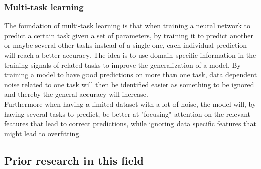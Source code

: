 \subsubsection{Multi-task learning}
The foundation of multi-task learning is that when training a neural network to predict a certain task given a set of parameters, by training it to predict another or maybe several other tasks instead of a single one, each individual prediction will reach a better accuracy. The idea is to use domain-specific information in the training signals of related tasks to improve the generalization of a model. By training a model to have good predictions on more than one task, data dependent noise related to one task will then be identified easier as something to be ignored and thereby the general accuracy will increase. \citep{ruder-2017}\\
Furthermore when having a limited dataset with a lot of noise, the model will, by having several tasks to predict, be better at "focusing" attention on the relevant features that lead to correct predictions, while ignoring data specific features that might lead to overfitting. 

\subsection{Prior research in this field}

